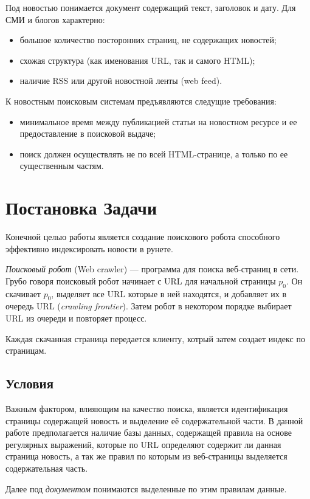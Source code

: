 Под новостью понимается документ содержащий текст, заголовок и дату. Для СМИ и
блогов характерно:
\begin{itemize} 
 \item большое количество посторонних страниц, не содержащих новостей;
 \item схожая структура (как именования URL, так и самого HTML);
 \item наличие RSS или другой новостной ленты (web feed).
\end{itemize}

К новостным поисковым системам предъявляются следущие требования:
\begin{itemize} 
\item минимальное время между публикацией статьи на новостном ресурсе и ее 
    предоставление в поисковой выдаче;
\item поиск должен осуществлять не по всей HTML-странице, а только по ее 
    существенным частям. 
\end{itemize}

\chapter{Постановка Задачи}
Конечной целью работы является создание поискового робота способного эффективно индексировать новости в рунете.

\textit{Поисковый робот} (Web crawler) --- программа для поиска веб-страниц в сети\cite{crawl}. Грубо говоря поисковый робот начинает с URL для начальной страницы $p_{0}$.
 Он скачивает $p_{0}$, выделяет все URL которые в ней находятся, и добавляет их в очередь URL (\textit{crawling frontier}). Затем робот в некотором порядке выбирает URL из очереди и повторяет процесс.

Каждая скачанная страница передается клиенту, котрый затем создает индекс по страницам.
\section{Условия}
Важным фактором, влияющим на качество поиска, является идентификация страницы содержащей новость
 и выделение её содержательной части. В данной работе предполагается наличие базы данных,
 содержащей правила на основе регулярных выражений, которые по URL определяют содержит ли данная страница новость,
 а так же правил по которым из веб-страницы выделяется содержательная часть.

Далее под \textit{документом} понимаются выделенные по этим правилам данные.

